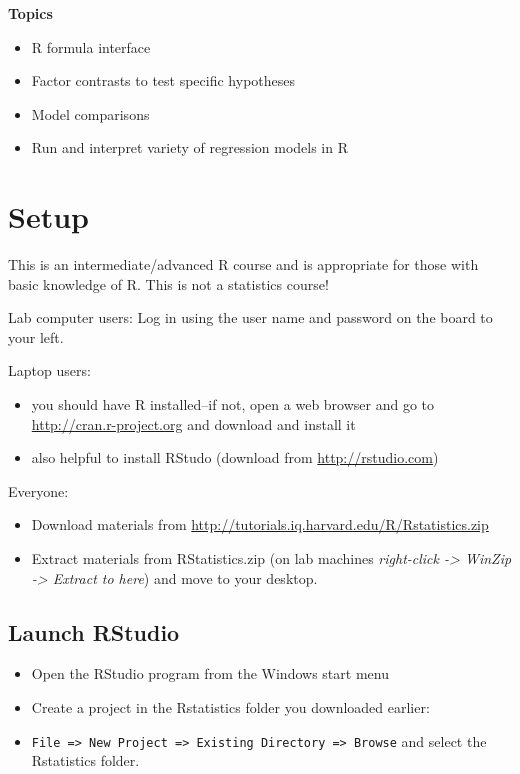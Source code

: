 \documentclass[]{book}
\providecommand{\tightlist}{%
  \setlength{\itemsep}{0pt}\setlength{\parskip}{0pt}}
\begin{document}
\textbf{Topics}

\begin{itemize}
\tightlist
\item
  R formula interface
\item
  Factor contrasts to test specific hypotheses
\item
  Model comparisons
\item
  Run and interpret variety of regression models in R
\end{itemize}

\section{Setup}\label{setup-1}

This is an intermediate/advanced R course and is appropriate for those
with basic knowledge of R. This is not a statistics course!

Lab computer users: Log in using the user name and password on the board
to your left.

Laptop users:

\begin{itemize}
\tightlist
\item
  you should have R installed--if not, open a web browser and go to
  \url{http://cran.r-project.org} and download and install it
\item
  also helpful to install RStudo (download from
  \url{http://rstudio.com})
\end{itemize}

Everyone:

\begin{itemize}
\tightlist
\item
  Download materials from
  \url{http://tutorials.iq.harvard.edu/R/Rstatistics.zip}
\item
  Extract materials from RStatistics.zip (on lab machines
  \emph{right-click -\textgreater{} WinZip -\textgreater{} Extract to
  here}) and move to your desktop.
\end{itemize}

\subsection{Launch RStudio}\label{launch-rstudio}

\begin{itemize}
\tightlist
\item
  Open the RStudio program from the Windows start menu
\item
  Create a project in the Rstatistics folder you downloaded earlier:
\item
  \texttt{File\ =\textgreater{}\ New\ Project\ =\textgreater{}\ Existing\ Directory\ =\textgreater{}\ Browse}
  and select the Rstatistics folder.
\end{itemize}
\end{document}
